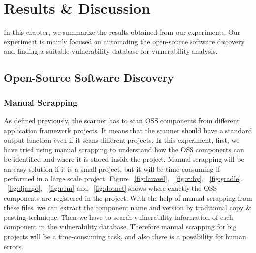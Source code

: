 %
\section{Results \& Discussion}\label{sec:Results & Discussion}
%
In this chapter, we summarize the results obtained from our experiments. Our experiment is mainly focused on automating the open-source software discovery and finding a suitable vulnerability database for vulnerability analysis.

\subsection{Open-Source Software Discovery}
\subsubsection{Manual Scrapping}
As defined previously, the scanner has to scan \acs{OSS} components from different application framework projects. It means that the scanner should have a standard output function even if it scans different projects. In this experiment, first, we have tried using manual scrapping to understand how the \acs{OSS} components can be identified and where it is stored inside the project. Manual scrapping will be an easy solution if it is a small project, but it will be time-consuming if performed in a large scale project. Figure ~\ref{fig:laravel}, ~\ref{fig:ruby}, ~\ref{fig:gradle}, ~\ref{fig:django}, ~\ref{fig:pom} and ~\ref{fig:dotnet} shows where exactly the OSS components are registered in the project. With the help of manual scrapping from these files, we can extract the component name and version by traditional copy \& pasting technique. Then we have to search vulnerability information of each component in the vulnerability database. Therefore manual scrapping for big projects will be a time-consuming task, and also there is a possibility for human errors.

